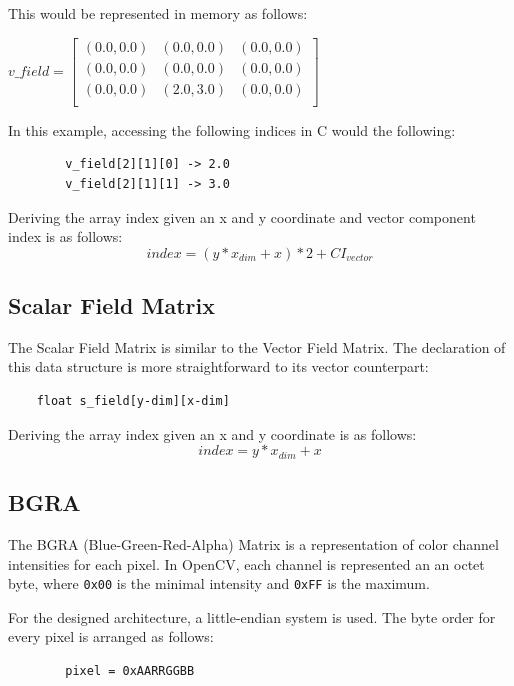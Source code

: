 \documentclass[
10pt, %
letterpaper, %
oneside, %
headinclude,footinclude, %
BCOR5mm, %
]{scrartcl}
\begin{document}
This would be represented in memory as follows:
\begin{center}
    $v\_field = \begin{bmatrix}
        (0.0,0.0) & (0.0,0.0) & (0.0, 0.0)\\
        (0.0,0.0) & (0.0,0.0) & (0.0, 0.0)\\
        (0.0,0.0) & (2.0,3.0) & (0.0, 0.0)\\
    \end{bmatrix}$
\end{center}

In this example, accessing the following indices in C would the following:
\begin{center}
    \begin{verbatim}
        v_field[2][1][0] -> 2.0
        v_field[2][1][1] -> 3.0
    \end{verbatim}
\end{center}

Deriving the array index given an x and y coordinate and vector component index is as follows:
\begin{equation}
    index = (y * x_{dim} + x) * 2 + CI_{vector}
\end{equation}

\subsection{Scalar Field Matrix}
The Scalar Field Matrix is similar to the Vector Field Matrix. The declaration of this data structure is more straightforward to its vector counterpart:
\begin{verbatim}
    float s_field[y-dim][x-dim]
\end{verbatim}
Deriving the array index given an x and y coordinate is as follows:
\begin{equation}
    index = y * x_{dim} + x
\end{equation}
    
\subsection{BGRA}
The BGRA (Blue-Green-Red-Alpha) Matrix is a representation of color channel intensities for each pixel. In OpenCV, each channel is represented
an an octet byte, where \verb|0x00| is the minimal intensity and \verb|0xFF| is the maximum.

For the designed architecture, a little-endian system is used. The byte order for every pixel is arranged as follows:
\begin{center}
    \begin{verbatim}
        pixel = 0xAARRGGBB
    \end{verbatim}
\end{center}
\end{document}

